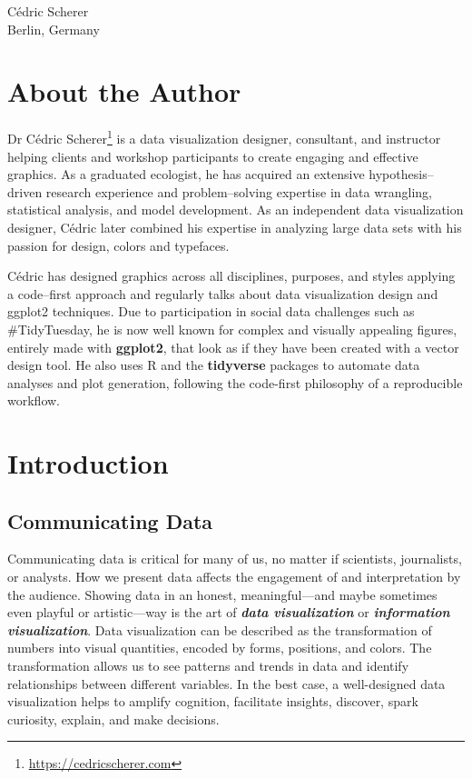 \documentclass[
]{krantz}
\renewcommand{\href}[2]{#2\footnote{\url{#1}}}
\begin{document}
\begin{flushright}
Cédric Scherer\\
Berlin, Germany
\end{flushright}

\hypertarget{about-the-author}{%
\chapter*{About the Author}\label{about-the-author}}


\href{https://cedricscherer.com}{Dr Cédric Scherer} is a data visualization designer, consultant, and instructor helping clients and workshop participants to create engaging and effective graphics. As a graduated ecologist, he has acquired an extensive hypothesis--driven research experience and problem--solving expertise in data wrangling, statistical analysis, and model development. As an independent data visualization designer, Cédric later combined his expertise in analyzing large data sets with his passion for design, colors and typefaces.

Cédric has designed graphics across all disciplines, purposes, and styles applying a code--first approach and regularly talks about data visualization design and ggplot2 techniques. Due to participation in social data challenges such as \#TidyTuesday, he is now well known for complex and visually appealing figures, entirely made with \textbf{ggplot2}, that look as if they have been created with a vector design tool. He also uses R and the \textbf{tidyverse} packages to automate data analyses and plot generation, following the code-first philosophy of a reproducible workflow.

\mainmatter

\hypertarget{introduction}{%
\chapter{Introduction}\label{introduction}}

\hypertarget{communication}{%
\section{Communicating Data}\label{communication}}

Communicating data is critical for many of us, no matter if scientists, journalists, or analysts. How we present data affects the engagement of and interpretation by the audience. Showing data in an honest, meaningful---and maybe sometimes even playful or artistic---way is the art of \textbf{\emph{data visualization}} or \textbf{\emph{information visualization}}. Data visualization can be described as the transformation of numbers into visual quantities, encoded by forms, positions, and colors. The transformation allows us to see patterns and trends in data and identify relationships between different variables. In the best case, a well-designed data visualization helps to amplify cognition, facilitate insights, discover, spark curiosity, explain, and make decisions.
\end{document}
